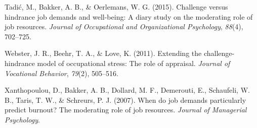 \documentclass[
  man]{apa6}
\newlength{\cslhangindent}
\newlength{\cslentryspacingunit} %
\newenvironment{CSLReferences}[2] %
 {%
  \setlength{\parindent}{0pt}
  \ifodd #1
  \let\oldpar\par
  \def\par{\hangindent=\cslhangindent\oldpar}
  \fi
  \setlength{\parskip}{#2\cslentryspacingunit}
 }%
 {}
\begin{document}
\begin{CSLReferences}{1}{0}
\leavevmode{}%
Tadić, M., Bakker, A. B., \& Oerlemans, W. G. (2015). Challenge versus hindrance job demands and well-being: A diary study on the moderating role of job resources. \emph{Journal of Occupational and Organizational Psychology}, \emph{88}(4), 702--725.

\leavevmode{}%
Webster, J. R., Beehr, T. A., \& Love, K. (2011). Extending the challenge-hindrance model of occupational stress: The role of appraisal. \emph{Journal of Vocational Behavior}, \emph{79}(2), 505--516.

\leavevmode{}%
Xanthopoulou, D., Bakker, A. B., Dollard, M. F., Demerouti, E., Schaufeli, W. B., Taris, T. W., \& Schreurs, P. J. (2007). When do job demands particularly predict burnout? The moderating role of job resources. \emph{Journal of Managerial Psychology}.

\end{CSLReferences}

\endgroup
\end{document}
